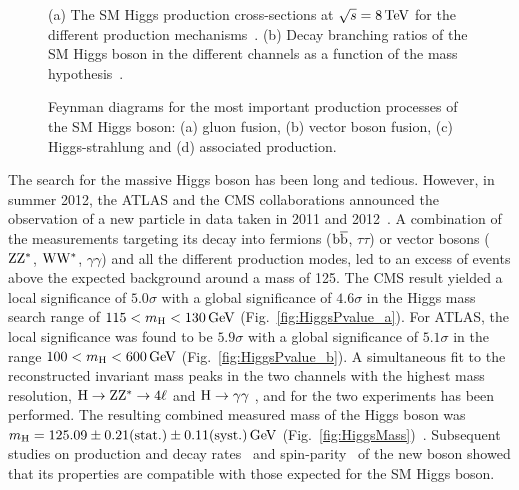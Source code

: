 \begin{figure}[!htb]
\centering
{}
\caption{(a) The SM Higgs production cross-sections at $\sqrt{s} = 8\,\text{Te\hspace{-.08em}V}$ for the different production mechanisms~\cite{Dittmaier:2011ti}. (b) Decay branching ratios of the SM Higgs boson in the different channels as a function of the mass hypothesis~\cite{Dittmaier:2011ti}.}
\label{fig:HiggsXS}
\end{figure}

\begin{figure}[!htb]
\centering
{}
\caption{Feynman diagrams for the most important production processes of the SM Higgs boson: (a) gluon fusion, (b) vector boson fusion, (c) Higgs-strahlung and (d) \ttbar associated production.}
\label{fig:HiggsProd}
\end{figure}

The search for the massive Higgs boson has been long and tedious. 
However, in summer 2012, the ATLAS and the CMS collaborations announced the observation of a new particle in data taken in 2011 and 2012~\cite{Chatrchyan:2013lba,Aad:2012tfa}.
A combination of the measurements targeting its decay into fermions (${\mathrm{b}\overline{\mathrm{b}}}$, $\tau\tau$) or vector bosons ($\mathrm{Z}\mathrm{Z}^*$, $\mathrm{W}\mathrm{W}^*$, $\gamma\gamma$) and all the different production modes, led to an excess of events above the expected background around a mass of 125\GeV.
The CMS result yielded a local significance of $5.0\sigma$ with a global significance of $4.6\sigma$ in the Higgs mass search range of $115 < m_\mathrm{H} < 130\,\text{Ge\hspace{-.08em}V}$ (Fig.~\ref{fig:HiggsPvalue_a}).
For ATLAS, the local significance was found to be $5.9\sigma$ with a global significance of $5.1\sigma$ in the range $100 < m_\mathrm{H} < 600\,\text{Ge\hspace{-.08em}V}$ (Fig.~\ref{fig:HiggsPvalue_b}).
A simultaneous fit to the reconstructed invariant mass peaks in the two channels with the highest mass resolution, $\mathrm{H} \to \mathrm{Z}\mathrm{Z}^* \to 4\ell$ and $\mathrm{H} \to \gamma\gamma$ , and for the two experiments has been performed.
The resulting combined measured mass of the Higgs boson was $m_\mathrm{H} = 125.09 \pm 0.21 \mbox{(stat.)} \pm 0.11 \mbox{(syst.)} \,\text{Ge\hspace{-.08em}V}$ (Fig.~\ref{fig:HiggsMass})~\cite{Aad:2015zhl}.
Subsequent studies on production and decay rates~\cite{Khachatryan:2016vau} and spin-parity~\cite{Aad:2015mxa,Chatrchyan:2012jja,Khachatryan:2014kca} of the new boson showed that its properties are compatible with those expected for the SM Higgs boson. 

